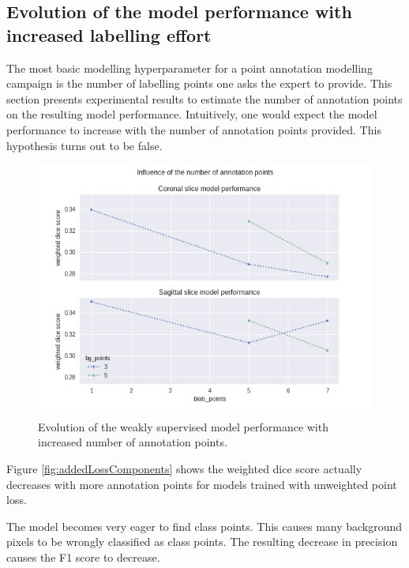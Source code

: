 \subsection{Evolution of the model performance with increased labelling effort\label{sec:numberofpoints}}
\par{
    The most basic modelling hyperparameter for a point annotation modelling campaign is the number of labelling points one asks the expert to provide.
    This section presents experimental results to estimate the number of annotation points on the resulting model performance.
    Intuitively, one would expect the model performance to increase with the number of annotation points provided.
    This hypothesis turns out to be false.
}
\begin{figure}
    \centering
    \includegraphics[width=.95\textwidth]{images/BlobPoints_influence.png}
    \caption{Evolution of the weakly supervised model performance with increased number of annotation points.}
\end{figure}
\par{
    Figure \ref{fig:addedLossComponents} shows the weighted dice score actually decreases with more annotation points for models trained with unweighted point loss.
    
    The model becomes very eager to find class points. This causes many background pixels to be wrongly classified as class points.
    The resulting decrease in precision causes the F1 score to decrease.
}
